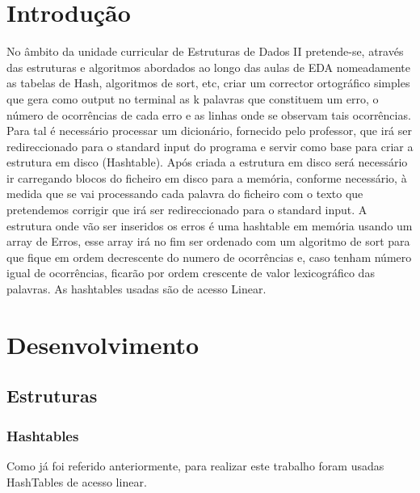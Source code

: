 \newpage
\thispagestyle{empty}
\renewcommand\contentsname{Índice}
\tableofcontents
\newpage
\renewcommand\listfigurename{Lista de Figuras}
\listoffigures
\newpage

\printindex
\section{Introdução}

\FloatBarrier

	No âmbito da unidade curricular de Estruturas de Dados II pretende-se, através das estruturas e algoritmos abordados ao longo das aulas de EDA nomeadamente as tabelas de Hash, algoritmos de sort, etc, criar um corrector ortográfico simples que gera como output no terminal as k palavras que constituem um erro, o número de ocorrências de cada erro e as linhas onde se observam tais ocorrências. Para tal é necessário processar um dicionário, fornecido pelo professor, que irá ser redireccionado para o standard input do programa e servir como base para criar a estrutura em disco (Hashtable). Após criada a estrutura em disco será necessário ir carregando blocos do ficheiro em disco para a memória, conforme necessário, à medida que se vai processando cada palavra do ficheiro com o texto que pretendemos corrigir que irá ser redireccionado para o standard input. A estrutura onde vão ser inseridos os erros é uma hashtable em memória usando um array de Erros, esse array irá no fim ser ordenado com um algoritmo de sort para que fique em ordem decrescente do numero de ocorrências e, caso tenham número igual de ocorrências, ficarão por ordem crescente de valor lexicográfico das palavras. As hashtables usadas são de acesso Linear.

\newpage

\section{Desenvolvimento}
\FloatBarrier

\subsection{Estruturas}

\subsubsection{Hashtables}

Como já foi referido anteriormente, para realizar este trabalho foram usadas HashTables de acesso linear.\\

